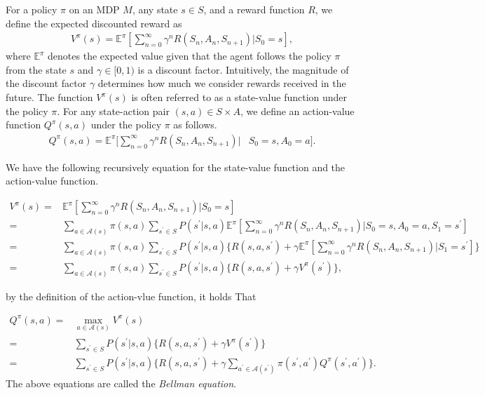 \documentclass[a4j,12pt,oneside,openany,english]{jsbook}
\begin{document}
\begin{definition}
  For a policy $\pi$ on an MDP $M$, any state $s \in S$, and a reward function $R$, we define the expected discounted reward as
  \begin{align*}
    V^{\pi}(s)= \mathbb{E}^{\pi}[\sum_{n=0}^{\infty}\gamma^n R(S_n, A_n, S_{n+1})|S_0 = s],
  \end{align*}
where $\mathbb{E}^{\pi}$ denotes the expected value given that the agent follows the policy $\pi$ from the state $s$ and $\gamma \in [0,1)$ is a discount factor. Intuitively, the magnitude of the discount factor $\gamma$ determines how much we consider rewards received in the future. The function $V^{\pi}(s)$ is often referred to as a state-value function under the policy $\pi$. For any state-action pair $(s,a) \in S \times A$, we define an action-value function $Q^{\pi}(s,a)$ under the policy $\pi$ as follows.
  \begin{align*}
    Q^{\pi}(s,a)= \mathbb{E}^{\pi}[\sum_{n=0}^{\infty}\gamma^n R(S_n, A_n, S_{n+1})|&S_0 = s, A_0 = a].
  \end{align*}

  We have the following recursively equation for the state-value function and the action-value function.

  \begin{align*}
    V^{\pi}(s) = & \mathbb{E}^{\pi}[\sum_{n=0}^{\infty}\gamma^n R(S_n, A_n, S_{n+1})|S_0 = s] \\
     = & \sum_{a \in \mathcal{A}(s)} \pi(s,a) \sum_{s^{\prime} \in S} P(s^{\prime}|s,a) \mathbb{E}^{\pi}[\sum_{n=0}^{\infty}\gamma^n R(S_n, A_n, S_{n+1})|S_0 = s, A_0 = a, S_1 = s^{\prime}] \\
     = & \sum_{a \in \mathcal{A}(s)} \pi(s,a) \sum_{s^{\prime} \in S} P(s^{\prime}|s,a) \{ R(s, a, s^{\prime}) + \gamma \mathbb{E}^{\pi}[\sum_{n=0}^{\infty}\gamma^n R(S_n, A_n, S_{n+1})|S_1 = s^{\prime}] \} \\
    = & \sum_{a \in \mathcal{A}(s)} \pi(s,a) \sum_{s^{\prime} \in S} P(s^{\prime}|s,a) \{ R(s, a, s^{\prime}) + \gamma V^{\pi}(s^{\prime}) \},
  \end{align*}
\end{definition}

by the definition of the action-vlue function, it holds That

\begin{align*}
  Q^{\pi}(s,a) = & \max_{a \in \mathcal{A}(s)}V^{\pi}(s) \\
               = & \sum_{s^{\prime} \in S} P(s^{\prime}|s,a) \{ R(s, a, s^{\prime}) + \gamma V^{\pi}(s^{\prime}) \} \\
               = & \sum_{s^{\prime} \in S} P(s^{\prime}|s,a) \{ R(s, a, s^{\prime}) + \gamma \sum_{a^{\prime} \in \mathcal{A}(s^{\prime})} \pi(s^{\prime}, a^{\prime}) Q^{\pi}(s^{\prime},a^{\prime}) \}.
\end{align*}
 The above equations are called the {\it Bellman equation}.
\end{document}
